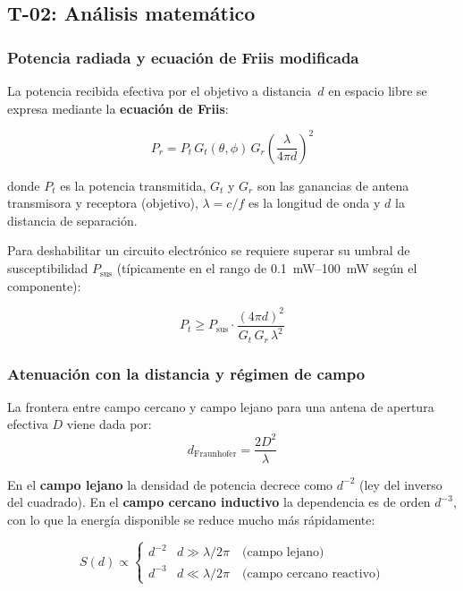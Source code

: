 \documentclass[11pt,a4paper]{article}
\begin{document}
\subsection{T-02: Análisis matemático}

\subsubsection{Potencia radiada y ecuación de Friis modificada}

La potencia recibida efectiva por el objetivo a distancia~$d$ en espacio libre se expresa mediante
la \textbf{ecuación de Friis}:

\begin{formulabox}
\begin{equation}
  P_r = P_t \, G_t(\theta, \phi) \, G_r \left(\frac{\lambda}{4\pi d}\right)^2
  \label{eq:friis}
\end{equation}
\end{formulabox}

donde $P_t$ es la potencia transmitida, $G_t$ y $G_r$ son las ganancias de antena transmisora
y receptora (objetivo), $\lambda = c/f$ es la longitud de onda y $d$ la distancia de separación.

Para deshabilitar un circuito electrónico se requiere superar su umbral de susceptibilidad
$P_{\text{sus}}$ (típicamente en el rango de \SIrange{0.1}{100}{\milli\watt} según el componente):

\begin{equation}
  P_t \geq P_{\text{sus}} \cdot \frac{(4\pi d)^2}{G_t \, G_r \, \lambda^2}
  \label{eq:potencianec}
\end{equation}

\subsubsection{Atenuación con la distancia y régimen de campo}

La frontera entre campo cercano y campo lejano para una antena de apertura efectiva $D$ viene dada por:
\[
  d_{\text{Fraunhofer}} = \frac{2D^2}{\lambda}
\]

En el \textbf{campo lejano} la densidad de potencia decrece como $d^{-2}$ (ley del inverso
del cuadrado). En el \textbf{campo cercano inductivo} la dependencia es de orden $d^{-3}$,
con lo que la energía disponible se reduce mucho más rápidamente:

\begin{equation}
  S(d) \propto \begin{cases}
    d^{-2} & d \gg \lambda/2\pi \quad \text{(campo lejano)} \\
    d^{-3} & d \ll \lambda/2\pi \quad \text{(campo cercano reactivo)}
  \end{cases}
\end{equation}
\end{document}

